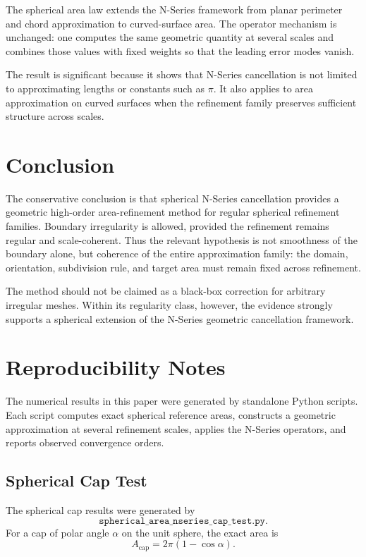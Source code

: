 \documentclass[11pt]{article}
\begin{document}
The spherical area law extends the N-Series framework from planar perimeter
and chord approximation to curved-surface area.  The operator mechanism is
unchanged: one computes the same geometric quantity at several scales and
combines those values with fixed weights so that the leading error modes
vanish.

The result is significant because it shows that N-Series cancellation is not
limited to approximating lengths or constants such as $\pi$.  It also applies
to area approximation on curved surfaces when the refinement family preserves
sufficient structure across scales.

\section{Conclusion}

The conservative conclusion is that spherical N-Series cancellation provides
a geometric high-order area-refinement method for regular spherical
refinement families.  Boundary irregularity is allowed, provided the
refinement remains regular and scale-coherent.  Thus the relevant hypothesis
is not smoothness of the boundary alone, but coherence of the entire
approximation family: the domain, orientation, subdivision rule, and target
area must remain fixed across refinement.

The method should not be claimed as a black-box correction for arbitrary
irregular meshes.  Within its regularity class, however, the evidence
strongly supports a spherical extension of the N-Series geometric
cancellation framework.

\appendix

\section{Reproducibility Notes}

The numerical results in this paper were generated by standalone Python
scripts.  Each script computes exact spherical reference areas, constructs a
geometric approximation at several refinement scales, applies the N-Series
operators, and reports observed convergence orders.

\subsection{Spherical Cap Test}

The spherical cap results were generated by
\[
  \texttt{spherical\_area\_nseries\_cap\_test.py}.
\]
For a cap of polar angle $\alpha$ on the unit sphere, the exact area is
\[
  A_{\mathrm{cap}}
  =
  2\pi(1-\cos\alpha).
\]
\end{document}
